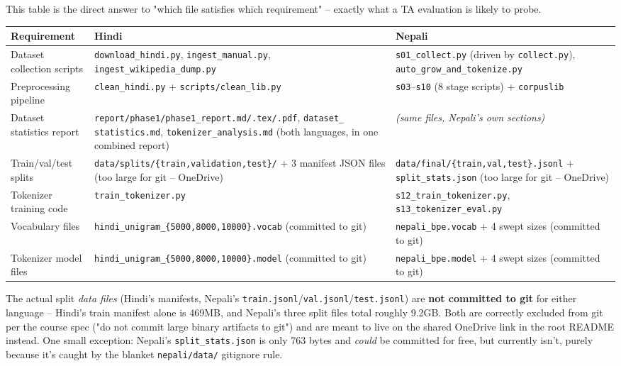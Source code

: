 \documentclass[11pt]{report}
\begin{document}
This table is the direct answer to "which file satisfies which
requirement" -- exactly what a TA evaluation is likely to probe.

\begin{center}
\begin{longtable}{p{2.6cm}p{5.6cm}p{5.6cm}}
\toprule
\textbf{Requirement} & \textbf{Hindi} & \textbf{Nepali} \\
\midrule
\endhead
Dataset collection scripts &
\texttt{download\_hindi.py}, \texttt{ingest\_manual.py},
\texttt{ingest\_wikipedia\_dump.py} &
\texttt{s01\_collect.py} (driven by \texttt{collect.py}),
\texttt{auto\_grow\_and\_tokenize.py} \\
Preprocessing pipeline &
\texttt{clean\_hindi.py} + \texttt{scripts/clean\_lib.py} &
\texttt{s03}--\texttt{s10} (8 stage scripts) + \texttt{corpuslib} \\
Dataset statistics report &
\texttt{report/phase1/phase1\_report.md/.tex/.pdf}, \texttt{dataset\_
statistics.md}, \texttt{tokenizer\_analysis.md} (both languages, in one
combined report) & \textit{(same files, Nepali's own sections)} \\
Train/val/test splits &
\texttt{data/splits/\{train,validation,test\}/} + 3 manifest JSON files
(too large for git -- OneDrive) &
\texttt{data/final/\{train,val,test\}.jsonl} +
\texttt{split\_stats.json} (too large for git -- OneDrive) \\
Tokenizer training code &
\texttt{train\_tokenizer.py} &
\texttt{s12\_train\_tokenizer.py}, \texttt{s13\_tokenizer\_eval.py} \\
Vocabulary files &
\texttt{hindi\_unigram\_\{5000,8000,10000\}.vocab} (committed to git) &
\texttt{nepali\_bpe.vocab} + 4 swept sizes (committed to git) \\
Tokenizer model files &
\texttt{hindi\_unigram\_\{5000,8000,10000\}.model} (committed to git) &
\texttt{nepali\_bpe.model} + 4 swept sizes (committed to git) \\
\bottomrule
\end{longtable}
\end{center}

\begin{notebox}
The actual split \textit{data files} (Hindi's manifests, Nepali's
\texttt{train.jsonl}/\texttt{val.jsonl}/\texttt{test.jsonl}) are
\textbf{not committed to git} for either language -- Hindi's train
manifest alone is 469MB, and Nepali's three split files total roughly
9.2GB. Both are correctly excluded from git per the course spec ("do not
commit large binary artifacts to git") and are meant to live on the
shared OneDrive link in the root README instead. One small exception:
Nepali's \texttt{split\_stats.json} is only 763 bytes and \textit{could}
be committed for free, but currently isn't, purely because it's caught
by the blanket \texttt{nepali/data/} gitignore rule.
\end{notebox}
\end{document}
